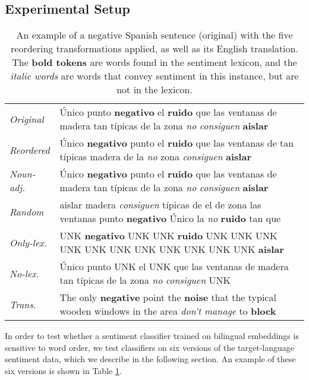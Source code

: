 \documentclass[11pt,a4paper]{article}
\begin{document}
\subsection{Experimental Setup}

\begin{table*}[]
\centering\small
\newcommand{\lex}[1]{{\setlength{\fboxsep}{1pt}\colorbox{lightred}{\textbf{#1}}}}
\newcommand{\nonlex}[1]{{\setlength{\fboxsep}{1pt}\colorbox{lighterred}{\textit{#1}}}}
\begin{tabular}{ll}
\toprule
\emph{Original} & Único punto \lex{negativo} el \lex{ruido} que las ventanas de madera tan típicas de la zona \nonlex{no} \nonlex{consiguen} \lex{aislar} \\[3pt]
\emph{Reordered} & Único \lex{negativo} punto el \lex{ruido} que las ventanas de tan típicas madera de la \nonlex{no} zona \nonlex{consiguen} \lex{aislar} \\[3pt]
\emph{Noun-adj.} & Único \lex{negativo} punto el \lex{ruido} que las ventanas de madera tan típicas de la zona \nonlex{no} \nonlex{consiguen} \lex{aislar} \\[3pt]
\emph{Random} & aislar madera \nonlex{consiguen} típicas de el de zona las ventanas punto \lex{negativo} Único la \nonlex{no} \lex{ruido} tan que\\[3pt]
\emph{Only-lex.} & UNK \lex{negativo} UNK UNK \lex{ruido} UNK UNK UNK UNK UNK UNK UNK UNK UNK UNK UNK  \lex{aislar}\\[3pt]
\emph{No-lex.} & Único punto UNK el UNK que las ventanas de madera tan típicas de la zona \nonlex{no} \nonlex{consiguen} UNK \\[3pt]
\cmidrule(lr){0-1}
\emph{Trans.} & The only \lex{negative} point the \lex{noise} that the typical wooden windows in the area \nonlex{don't manage} to \lex{block} \\[3pt]
\bottomrule
\end{tabular}
\caption{An example of a negative Spanish sentence (original) with the five reordering
transformations applied, as well as its English translation. The \lex{bold tokens} are words found in the sentiment lexicon, and the \nonlex{italic words} are words that convey sentiment in this instance, but are not in the lexicon.}
\label{example}

\end{table*}

In order to test whether a sentiment classifier trained on bilingual embeddings is sensitive to word order, we test classifiers on six versions of the target-language sentiment data, which we describe in the following section. An example of these six versions is shown in Table \ref{example}.
\end{document}
